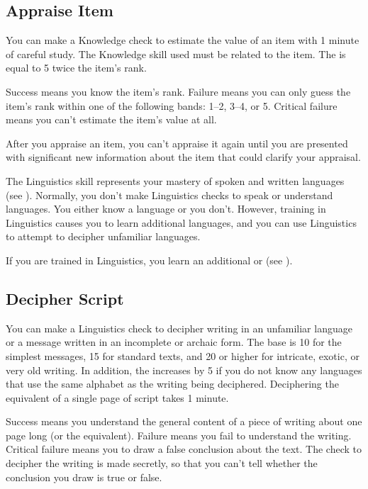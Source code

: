     \subsection{Appraise Item}
        You can make a Knowledge check to estimate the value of an item with 1 minute of careful study. The Knowledge skill used must be related to the item.
        The  is equal to 5 \add twice the item's rank.

        Success means you know the item's rank.
        Failure means you can only guess the item's rank within one of the following bands: 1--2, 3--4, or 5\plus.
        Critical failure means you can't estimate the item's value at all.

        After you appraise an item, you can't appraise it again until you are presented with significant new information about the item that could clarify your appraisal.

\newpage
{}
        The Linguistics skill represents your mastery of spoken and written languages (see ).
        Normally, you don't make Linguistics checks to speak or understand languages.
        You either know a language or you don't.
        However, training in Linguistics causes you to learn additional languages, and you can use Linguistics to attempt to decipher unfamiliar languages.

        If you are trained in Linguistics, you learn an additional  or  (see ).

    \subsection{Decipher Script}
        You can make a Linguistics check to decipher writing in an unfamiliar language or a message written in an incomplete or archaic form. The base  is 10 for the simplest messages, 15 for standard texts, and 20 or higher for intricate, exotic, or very old writing. In addition, the  increases by 5 if you do not know any languages that use the same alphabet as the writing being deciphered. Deciphering the equivalent of a single page of script takes 1 minute.

        Success means you understand the general content of a piece of writing about one page long (or the equivalent). Failure means you fail to understand the writing. Critical failure means you to draw a false conclusion about the text. The check to decipher the writing is made secretly, so that you can't tell whether the conclusion you draw is true or false.

